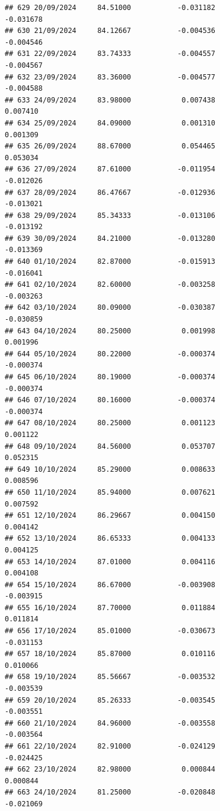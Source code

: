 \documentclass[
]{article}
\begin{document}
\begin{verbatim}
## 629 20/09/2024     84.51000           -0.031182               -0.031678
## 630 21/09/2024     84.12667           -0.004536               -0.004546
## 631 22/09/2024     83.74333           -0.004557               -0.004567
## 632 23/09/2024     83.36000           -0.004577               -0.004588
## 633 24/09/2024     83.98000            0.007438                0.007410
## 634 25/09/2024     84.09000            0.001310                0.001309
## 635 26/09/2024     88.67000            0.054465                0.053034
## 636 27/09/2024     87.61000           -0.011954               -0.012026
## 637 28/09/2024     86.47667           -0.012936               -0.013021
## 638 29/09/2024     85.34333           -0.013106               -0.013192
## 639 30/09/2024     84.21000           -0.013280               -0.013369
## 640 01/10/2024     82.87000           -0.015913               -0.016041
## 641 02/10/2024     82.60000           -0.003258               -0.003263
## 642 03/10/2024     80.09000           -0.030387               -0.030859
## 643 04/10/2024     80.25000            0.001998                0.001996
## 644 05/10/2024     80.22000           -0.000374               -0.000374
## 645 06/10/2024     80.19000           -0.000374               -0.000374
## 646 07/10/2024     80.16000           -0.000374               -0.000374
## 647 08/10/2024     80.25000            0.001123                0.001122
## 648 09/10/2024     84.56000            0.053707                0.052315
## 649 10/10/2024     85.29000            0.008633                0.008596
## 650 11/10/2024     85.94000            0.007621                0.007592
## 651 12/10/2024     86.29667            0.004150                0.004142
## 652 13/10/2024     86.65333            0.004133                0.004125
## 653 14/10/2024     87.01000            0.004116                0.004108
## 654 15/10/2024     86.67000           -0.003908               -0.003915
## 655 16/10/2024     87.70000            0.011884                0.011814
## 656 17/10/2024     85.01000           -0.030673               -0.031153
## 657 18/10/2024     85.87000            0.010116                0.010066
## 658 19/10/2024     85.56667           -0.003532               -0.003539
## 659 20/10/2024     85.26333           -0.003545               -0.003551
## 660 21/10/2024     84.96000           -0.003558               -0.003564
## 661 22/10/2024     82.91000           -0.024129               -0.024425
## 662 23/10/2024     82.98000            0.000844                0.000844
## 663 24/10/2024     81.25000           -0.020848               -0.021069

\end{verbatim}
\end{document}
